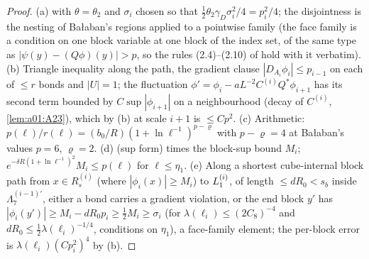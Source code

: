 \begin{proof}
(a)  with $\theta=\theta_2$ and $\sigma_i$ chosen so that $\frac12\theta_2\gamma_D\sigma_i^2/4=p_i^2/4$; the disjointness is the nesting of Ba{\l}aban's regions applied to a pointwise family (the face family is a condition on one block variable at one block of the index set, of the same type as $|\psi(y)-(Q\phi)(y)|>p$, so the rules (2.4)--(2.10) of \cite{Ba2} hold with it verbatim). (b) Triangle inequality along the path, the gradient clause $|D_{A_i}\phi_i|\le p_{i-1}$ on each of $\le r$ bonds and $|U|=1$; the fluctuation $\phi'=\phi_i-aL^{-2}C^{(i)}Q^*\phi_{i+1}$ has its second term bounded by $C\sup|\phi_{i+1}|$ on a neighbourhood (decay of $C^{(i)}$, \cref{lem:a01:A23}), which by (b) at scale $i+1$ is $\le Cp^2$. (c) Arithmetic: $p(\ell)/r(\ell)=(b_0/R)(1+\ln\ell^{-1})^{p-\varrho}$ with $p-\varrho=4$ at Ba{\l}aban's values $p=6$, $\varrho=2$. (d)  (sup form) times the block-sup bound $M_i$; $e^{-\delta R(1+\ln\ell^{-1})^2}M_i\le p(\ell)$ for $\ell\le\eta_1$. (e) Along a shortest cube-internal block path from $x\in R_s^{(i)}$ (where $|\phi_i(x)|\ge M_i$) to $L_{1}^{(i)}$, of length $\le dR_0<s_b$ inside $\Lambda_7^{(i-1)\prime}$, either a bond carries a gradient violation, or the end block $y'$ has $|\phi_i(y')|\ge M_i-dR_0p_i\ge\frac12M_i\ge\sigma_i$ (for $\lambda(\ell_i)\le(2C_8)^{-4}$ and $dR_0\le\frac12\lambda(\ell_i)^{-1/4}$, conditions on $\eta_1$), a face-family element; the per-block error is $\lambda(\ell_i)(Cp_i^2)^4$ by (b).
\end{proof}

